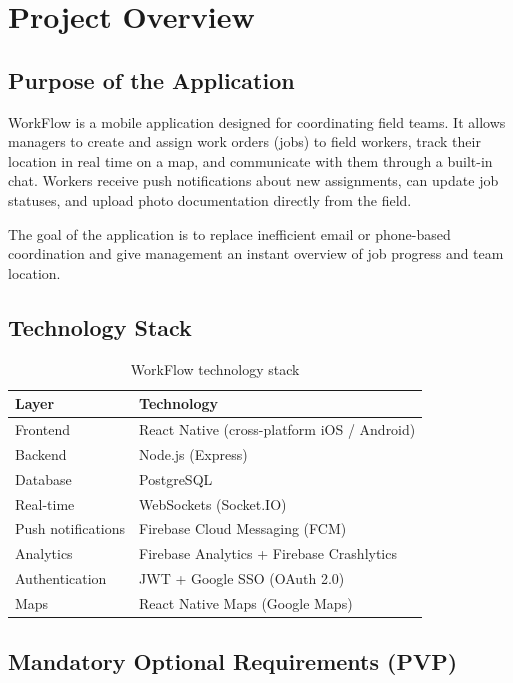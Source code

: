 \chapter{Project Overview}

\section{Purpose of the Application}

WorkFlow is a mobile application designed for coordinating field teams. It allows managers to create and assign work orders (jobs) to field workers, track their location in real time on a map, and communicate with them through a built-in chat. Workers receive push notifications about new assignments, can update job statuses, and upload photo documentation directly from the field.

The goal of the application is to replace inefficient email or phone-based coordination and give management an instant overview of job progress and team location.

\section{Technology Stack}

\begin{table}[H]
  \centering
  \begin{tabularx}{\textwidth}{lX}
    \toprule
    \textbf{Layer} & \textbf{Technology} \\
    \midrule
    Frontend           & React Native (cross-platform iOS / Android) \\
    Backend            & Node.js (Express) \\
    Database           & PostgreSQL \\
    Real-time          & WebSockets (Socket.IO) \\
    Push notifications & Firebase Cloud Messaging (FCM) \\
    Analytics          & Firebase Analytics + Firebase Crashlytics \\
    Authentication     & JWT + Google SSO (OAuth 2.0) \\
    Maps               & React Native Maps (Google Maps) \\
    \bottomrule
  \end{tabularx}
  \caption{WorkFlow technology stack}
\end{table}

\section{Mandatory Optional Requirements (PVP)}

